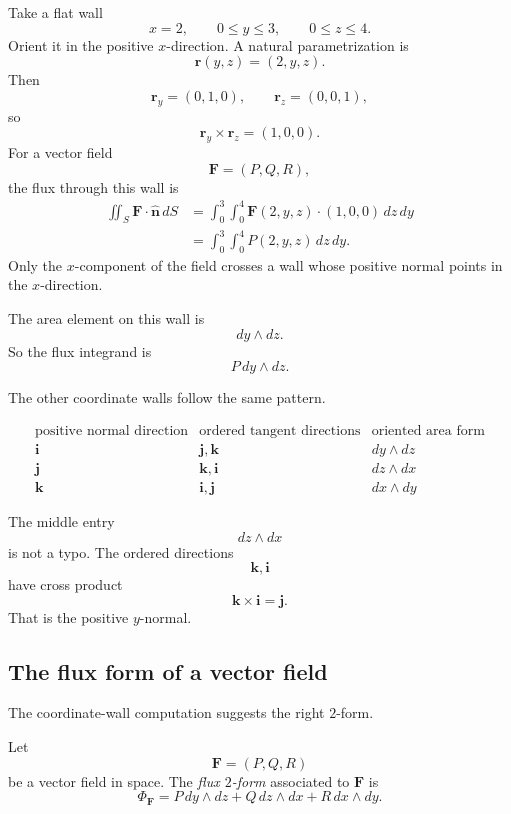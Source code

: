 Take a flat wall
\[
    x=2,\qquad 0\le y\le3,\qquad 0\le z\le4.
\]
Orient it in the positive \(x\)-direction.  A natural parametrization is
\[
    \mathbf r(y,z)=(2,y,z).
\]
Then
\[
    \mathbf r_y=(0,1,0),
    \qquad
    \mathbf r_z=(0,0,1),
\]
so
\[
    \mathbf r_y\times\mathbf r_z=(1,0,0).
\]
For a vector field
\[
    \mathbf F=(P,Q,R),
\]
the flux through this wall is
\[
\begin{aligned}
    \iint_S \mathbf F\cdot\widehat{\mathbf n}\,dS
    &=
    \int_0^3\int_0^4
    \mathbf F(2,y,z)\cdot(1,0,0)\,dz\,dy\\
    &=
    \int_0^3\int_0^4 P(2,y,z)\,dz\,dy.
\end{aligned}
\]
Only the \(x\)-component of the field crosses a wall whose positive normal points in
the \(x\)-direction.

The area element on this wall is
\[
    dy\wedge dz.
\]
So the flux integrand is
\[
    P\,dy\wedge dz.
\]

The other coordinate walls follow the same pattern.

\[
\begin{array}{c|c|c}
\text{positive normal direction} & \text{ordered tangent directions} & \text{oriented area form}\\ \hline
\mathbf i & \mathbf j,\mathbf k & dy\wedge dz\\[1mm]
\mathbf j & \mathbf k,\mathbf i & dz\wedge dx\\[1mm]
\mathbf k & \mathbf i,\mathbf j & dx\wedge dy
\end{array}
\]

The middle entry
\[
    dz\wedge dx
\]
is not a typo.  The ordered directions
\[
    \mathbf k,\mathbf i
\]
have cross product
\[
    \mathbf k\times\mathbf i=\mathbf j.
\]
That is the positive \(y\)-normal.

\subsection{The flux form of a vector field}

The coordinate-wall computation suggests the right \(2\)-form.

\begin{definition}
Let
\[
    \mathbf F=(P,Q,R)
\]
be a vector field in space.  The \emph{flux \(2\)-form} associated to \(\mathbf F\) is
\[
\boxed{
    \Phi_{\mathbf F}
    =
    P\,dy\wedge dz
    +
    Q\,dz\wedge dx
    +
    R\,dx\wedge dy.
}
\]
\end{definition}

